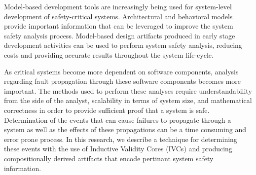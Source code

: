 Model-based development tools are increasingly being used for system-level development of safety-critical systems. Architectural and behavioral models  provide important information that can be leveraged to improve the system safety analysis process. Model-based design artifacts produced in early stage development activities can be used to perform system safety analysis, reducing costs and providing accurate results throughout the system life-cycle.

As critical systems become more dependent on software components, analysis regarding fault propagation through these software components becomes more important. The methods used to perform these analyses require understandability from the side of the analyst, scalability in terms of system size, and mathematical correctness in order to provide sufficient proof that a system is safe. Determination of the events that can cause failures to propagate through a system as well as the effects of these propagations can be a time consuming and error prone process. In this research, we describe a technique for determining these events with the use of Inductive Validity Cores (IVCs) and producing compositionally derived artifacts that encode pertinant system safety information.






